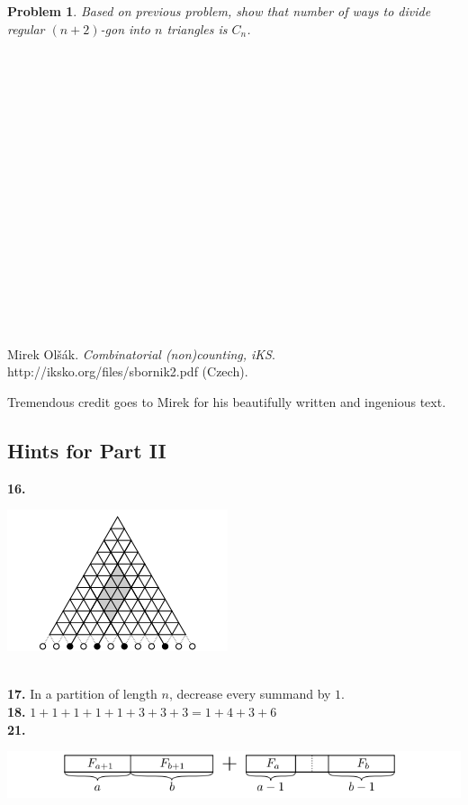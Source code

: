 \documentclass[11pt,a5paper]{article}
\newtheorem{problem}{Problem}
\begin{document}
\begin{problem}
Based on previous problem, show that number of ways to divide regular $(n+2)$-gon into $n$ triangles is $C_n$.	
\end{problem}

\ \\\\\\\\\\\\\\\\\\\\\\\\\\\\\\\\

\begin{thebibliography}{9}
 Mirek Olšák. 
	\emph{Combinatorial (non)counting, iKS}. \\http://iksko.org/files/sbornik2.pdf  (Czech).
\end{thebibliography}
Tremendous credit goes to Mirek for his beautifully written and ingenious text.

\break 

\subsection*{Hints for Part II}
\textbf{16.} \\
\centerline{\includegraphics[scale=0.5]{hint16}} \\

\noindent\textbf{17.} In a partition of length $n$, decrease every summand by $1$. \\

\noindent\textbf{18.} $1 + 1 + 1 + 1 + 1 + 3 + 3 + 3 = 1 + 4 + 3 + 6$ \\

\noindent\textbf{21.} \\
\centerline{\includegraphics[scale=0.44]{hint21}} \\
\end{document}
